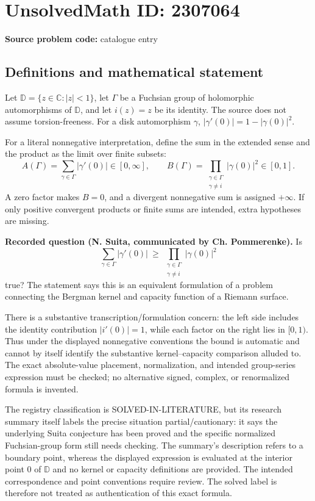 \documentclass[11pt]{article}
\newcommand{\C}{\mathbb{C}}
\begin{document}
\section*{UnsolvedMath ID: 2307064}
\textbf{Source problem code:} catalogue entry
\subsection{Definitions and mathematical statement}
Let $\mathbb D=\{z\in\C:|z|<1\}$, let $\Gamma$ be a Fuchsian group of holomorphic automorphisms of $\mathbb D$, and let $i(z)=z$ be its identity. The source does not assume torsion-freeness. For a disk automorphism $\gamma$, $|\gamma'(0)|=1-|\gamma(0)|^2$.

For a literal nonnegative interpretation, define the sum in the extended sense and the product as the limit over finite subsets:
\[
 A(\Gamma)=\sum_{\gamma\in\Gamma}|\gamma'(0)|\in[0,\infty],\qquad
 B(\Gamma)=\prod_{\substack{\gamma\in\Gamma\\\gamma\ne i}}|\gamma(0)|^2\in[0,1].
\]
A zero factor makes $B=0$, and a divergent nonnegative sum is assigned $+\infty$. If only positive convergent products or finite sums are intended, extra hypotheses are missing.

\textbf{Recorded question (N. Suita, communicated by Ch. Pommerenke).} Is
\[
 \sum_{\gamma\in\Gamma}|\gamma'(0)|\ \geq\
 \prod_{\substack{\gamma\in\Gamma\\\gamma\ne i}}|\gamma(0)|^2
\]
true? The statement says this is an equivalent formulation of a problem connecting the Bergman kernel and capacity function of a Riemann surface.

There is a substantive transcription/formulation concern: the left side includes the identity contribution $|i'(0)|=1$, while each factor on the right lies in $[0,1)$. Thus under the displayed nonnegative conventions the bound is automatic and cannot by itself identify the substantive kernel--capacity comparison alluded to. The exact absolute-value placement, normalization, and intended group-series expression must be checked; no alternative signed, complex, or renormalized formula is invented.

The registry classification is SOLVED-IN-LITERATURE, but its research summary itself labels the precise situation partial/cautionary: it says the underlying Suita conjecture has been proved and the specific normalized Fuchsian-group form still needs checking. The summary's description refers to a boundary point, whereas the displayed expression is evaluated at the interior point $0$ of $\mathbb D$ and no kernel or capacity definitions are provided. The intended correspondence and point conventions require review. The solved label is therefore not treated as authentication of this exact formula.
\end{document}
